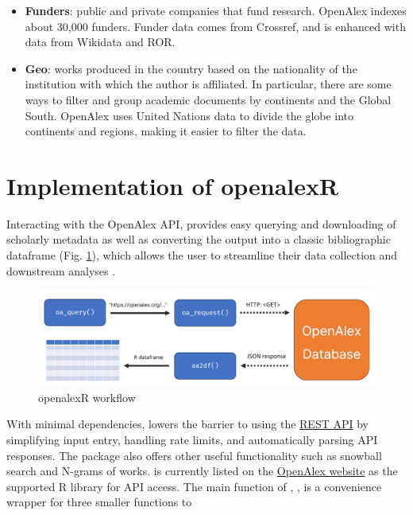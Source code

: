 \begin{itemize}
\item \textbf{Funders}: public and private companies that fund research. OpenAlex indexes about 30,000 funders. Funder data comes from Crossref, and is enhanced with data from Wikidata and ROR.

\item \textbf{Geo}: works produced in the country based on the nationality of the institution with which the author is affiliated. In particular, there are some ways to filter and group academic documents by continents and the Global South. OpenAlex uses United Nations data to divide the globe into continents and regions, making it easier to filter the data.

\end{itemize}



\section{Implementation of openalexR} \label{implementation}

Interacting with the OpenAlex API,  provides easy querying and downloading of scholarly metadata as well as converting the output into a classic bibliographic dataframe (Fig. \ref{oa_workflow}), which allows the user to streamline their data collection and downstream analyses \citep{oaR}.

\begin{figure}[htbp]
  \centering
  \includegraphics[scale=0.3]{figures/oa_workflow}
  \caption{openalexR workflow}
  \label{oa_workflow}
\end{figure} 

With minimal dependencies,  lowers the barrier to using the \href{https://docs.openalex.org/how-to-use-the-api/api-overview}{REST API} by simplifying input entry, handling rate limits, and automatically parsing API responses.
The package also offers other useful functionality such as snowball search and N-grams of works.
 is currently listed on the \href{https://docs.openalex.org/api#client-libraries}{OpenAlex website} as the supported R library for API access.
The main function of , , is a convenience wrapper for three smaller functions to

